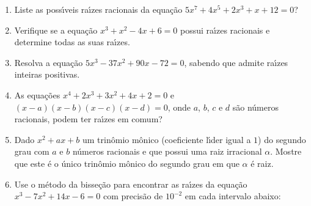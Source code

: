 \documentclass[a4paper,5pt]{amsbook}
\newcommand{\ds}{\displaystyle}
\begin{document}
\vspace{1cm}
\begin{enumerate}
    \vspace{0.5cm}
    \item Liste as poss\'{\i}veis ra\'{\i}zes racionais da equa\c{c}\~ao
        $5x^7+4x^5+2x^3+x+12=0$?

	\vspace{0.5cm}
    \item Verifique se a equa\c{c}\~ao $x^3+x^2-4x+6=0$ possui ra\'{\i}zes racionais e
        determine todas as suas ra\'{\i}zes.

    \vspace{0.5cm}
    \item Resolva a equa\c{c}\~ao $5x^3-37x^2+90x-72=0$, sabendo que admite ra\'{\i}zes
        inteiras positivas.

    \vspace{0.5cm}
    \item As equa\c{c}\~oes $x^4+2x^3+3x^2+4x+2=0$ e $(x-a)(x-b)(x-c)(x-d)=0$, onde
        $a$, $b$, $c$ e $d$ s\~ao n\'umeros racionais,  podem ter ra\'{\i}zes em comum?

    \vspace{0.5cm}
    \item Dado $x^2+ax+b$ um trin\^omio m\^onico (coeficiente l\'{\i}der igual a $1$) do
        segundo grau com $a$ e $b$ n\'umeros racionais e que possui uma raiz
        irracional $\alpha$. Mostre que este \'e o \'unico trin\^omio m\^onico do
        segundo grau em que $\alpha$ \'e raiz.

    \vspace{0.5cm}
    \item Use o m\'etodo da bisse\c{c}\~ao para encontrar as ra\'{\i}zes da equa\c{c}\~ao
        $x^3-7x^2+14x-6=0$ com precis\~ao de $10^{-2}$ em cada intervalo
        abaixo:
        \vspace{0.3cm}

\end{enumerate}
\end{document}

